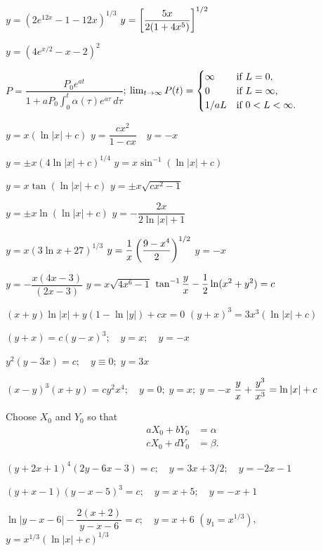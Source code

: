  $y=(2e^{12x}-1-12x)^{1/3}$
 $y=\displaystyle{\left[\frac{5x}{2(1+4x^5)}\right]^{1/2}}$

 $y=(4e^{x/2}-x-2)^2$



$P=\dfrac{P_0e^{at}}{1+aP_0\int_0^t\alpha(\tau)e^{a\tau}\,d\tau}$;\quad
 $\lim_{t\to\infty}P(t)=
\displaystyle{\begin{cases}
\infty&\text{if }L=0,\\
0&\text{if }L=\infty,\\
1/aL&\text{if } 0<L<\infty.
\end{cases}}$


   $y=x(\ln|x|+c)$
 $y=\dfrac{cx^2}{1-cx}   \quad y=-x$

   $y=\pm x(4\ln|x|+c)^{1/4}$
   $y=x\sin^{-1} (\ln |x|+c)$

   $y=x \tan(\ln |x|+c)$
 $y=\pm x\sqrt{cx^2-1}$

   $y=\pm x\ln(\ln|x|+c)$
   $y=-\dfrac{2x}{2 \ln |x|+1}$

  $y=x(3 \ln x+27)^{1/3}$
  $y=\displaystyle{\frac{1}{x}\left(\frac{9-x^4}{2}\right)^{1/2}}$
 $y=-x$

  $y=-\dfrac{x(4x-3)}{(2x-3)}$
   $y=x\sqrt{4x^6-1}$
   $\displaystyle{\tan^{-1}\frac{y}{x} -\frac{1}{2} \ln (x^2+y^2)=c}$

  $(x+y)\ln |x|+y(1-\ln |y|)+cx=0$
   $(y+x)^3=3x^3(\ln|x|+c)$

 $(y+x)=c(y-x)^3; \quad y =x;\quad y=-x$

 $y^2(y-3x)=c;\quad y\equiv0;\;  y=3x$

 $(x-y)^3(x+y)=cy^2x^4; \quad y=0;\;  y=x;\;  y=-x$
 $\displaystyle{\frac{y}{x}+\frac{y^3}{x^3}}=\ln |x|+c$

 Choose $X_0$ and $Y_0$ so that
\begin{align*}
a X_0+b Y_0 &=\alpha \\
c X_0+d Y_0 &=\beta.
\end{align*}

$(y+2x+1)^4(2y-6x-3)=c; \quad y=3x+3/2; \quad y=-2x-1$

$(y+x-1)(y-x-5)^3=c; \quad y=x+5; \quad y=-x+1$


 $\ln|y-x-6|-\dfrac{2(x+2)}{y-x-6}=c; \quad y=x+6$
 $(y_1=x^{1/3})$, $y=x^{1/3}(\ln|x|+c)^{1/3}$

